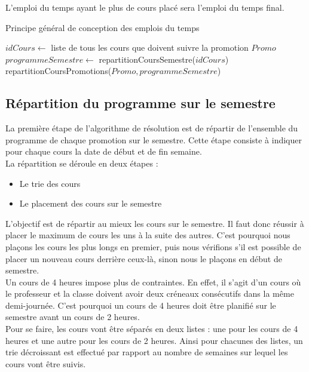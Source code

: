 \documentclass[12pt,a4paper,french]{article}
\begin{document}
L'emploi du temps ayant le plus de cours placé sera l'emploi du temps final.

\begin{algorithm}
\caption{Principe général de conception des emplois du temps}
\begin{algorithmic}
\STATE $idCours \leftarrow$ liste de tous les cours que doivent suivre la promotion $Promo$
\STATE $programmeSemestre \leftarrow $ repartitionCoursSemestre($idCours$)
\STATE repartitionCoursPromotions($Promo, programmeSemestre$)
\ENDFOR
\end{algorithmic}
\end{algorithm}

\subsection{Répartition du programme sur le semestre}
La première étape de l'algorithme de résolution est de répartir de l'ensemble du programme de chaque promotion sur le semestre. Cette étape consiste à indiquer pour chaque cours la date de début et de fin semaine.\\

La répartition se déroule en deux étapes : 
\begin{itemize}
\item Le trie des cours 
\item Le placement des cours sur le semestre\\
\end{itemize}

L'objectif est de répartir au mieux les cours sur le semestre. Il faut donc réussir à placer le maximum de cours les uns à la suite des autres. C'est pourquoi nous plaçons les cours les plus longs en premier, puis nous vérifions s'il est possible de placer un nouveau cours derrière ceux-là, sinon nous le plaçons en début de semestre.\\

Un cours de 4 heures impose plus de contraintes. En effet, il s'agit d'un cours où le professeur et la classe doivent avoir deux créneaux consécutifs dans la même demi-journée. C'est pourquoi un cours de 4 heures doit être planifié sur le semestre avant un cours de 2 heures.\\

Pour se faire, les cours vont être séparés en deux listes : une pour les cours de 4 heures et une autre pour les cours de 2 heures. Ainsi pour chacunes des listes, un trie décroissant est effectué par rapport au nombre de semaines sur lequel les cours vont être suivis.\\
\end{document}
